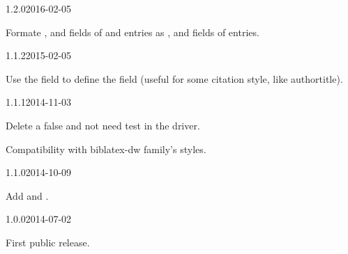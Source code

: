 \documentclass{ltxdockit}[2011/03/25]
\begin{document}
\begin{changelog}
\begin{release}{1.2.0}{2016-02-05}
\item Formate   ,  and  fields of   and  entries as ,  and  fields of  entries.
\end{release}

\begin{release}{1.1.2}{2015-02-05}
\item Use the  field to define the  field (useful for some citation style, like authortitle).
\end{release}

\begin{release}{1.1.1}{2014-11-03}
\item Delete a false and not need test in the driver.
\item Compatibility with biblatex-dw family's styles.
\end{release}
\begin{release}{1.1.0}{2014-10-09}
\item Add  and .
\end{release}

\begin{release}{1.0.0}{2014-07-02}
\item First public release.
\end{release}
\end{changelog}
\end{document}
